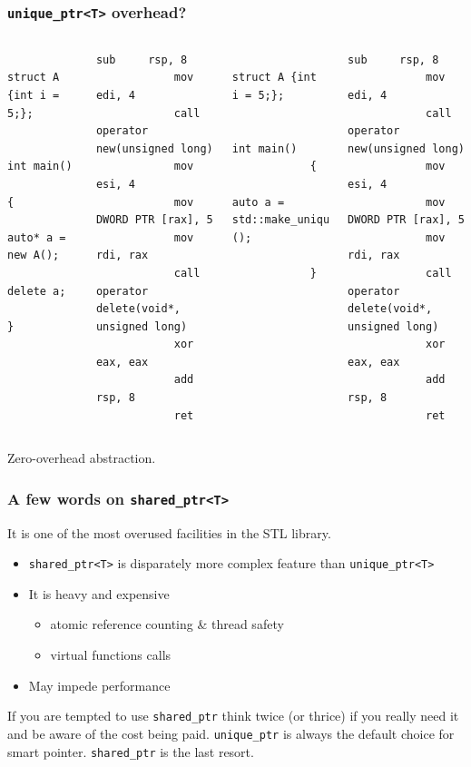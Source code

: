\documentclass{beamer}
\begin{document}
\begin{frame}[fragile,t]
\frametitle{\texttt{unique\_ptr<T>} overhead?}
	\begin{columns}[t]
		\begin{lstlisting}
			struct A {int i = 5;};
			
			int main()
			{
				auto* a = new A();
				delete a;
			}
		\end{lstlisting}
		
		\begin{lstlisting}[backgroundcolor=\color{black}, basicstyle=\color{white}\tiny]
			sub     rsp, 8
			mov     edi, 4
			call    operator new(unsigned long)
			mov     esi, 4
			mov     DWORD PTR [rax], 5
			mov     rdi, rax
			call    operator delete(void*, unsigned long)
			xor     eax, eax
			add     rsp, 8
			ret
		\end{lstlisting}
	\pause
		\begin{lstlisting}
			struct A {int i = 5;};		
		
			int main()
			{
				auto a = std::make_unique<A>();
				
			}			
        \end{lstlisting}
        
        \begin{lstlisting}[backgroundcolor=\color{black}, basicstyle=\color{white}\tiny]
			sub     rsp, 8
			mov     edi, 4
			call    operator new(unsigned long)
			mov     esi, 4
			mov     DWORD PTR [rax], 5
			mov     rdi, rax
			call    operator delete(void*, unsigned long)
			xor     eax, eax
			add     rsp, 8
			ret
        \end{lstlisting}
	\end{columns}
	\pause
	\begin{center}Zero-overhead abstraction.\end{center}
\end{frame}

\begin{frame}
\frametitle{A few words on \texttt{shared\_ptr<T>}}
	It is one of the most overused facilities in the STL library. \newline
	\begin{itemize}
		\item \texttt{shared\_ptr<T>} is disparately more complex feature than
			  \texttt{unique\_ptr<T>}
		\item It is heavy and expensive
		\begin{itemize}
			\item atomic reference counting \& thread safety
			\item virtual functions calls
		\end{itemize}
		\item May impede performance
		
	\end{itemize}
	If you are tempted to use \texttt{shared\_ptr} think twice (or thrice) if you really
			  need it and be aware of the cost being paid. \newline
	\texttt{unique\_ptr} is always the default choice for smart pointer. \texttt{shared\_ptr} is the last resort.
\end{frame}
\end{document}
